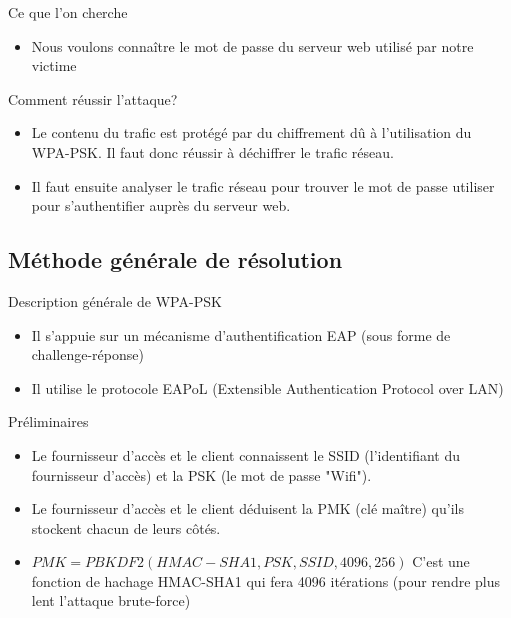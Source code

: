 \documentclass{beamer}
\begin{document}
	\begin{frame}
	\begin{block}{Ce que l'on cherche}
		\begin{itemize}
			\item Nous voulons connaître le mot de passe du serveur web utilisé par notre victime
		\end{itemize}
	\end{block}
	\begin{block}{Comment réussir l'attaque?}
		\begin{itemize}
			\item Le contenu du trafic est protégé par du chiffrement dû à l'utilisation du WPA-PSK. Il faut donc réussir à déchiffrer le trafic réseau.
			\item Il faut ensuite analyser le trafic réseau pour trouver le mot de passe utiliser pour s'authentifier auprès du serveur web.
		\end{itemize}
	\end{block}
	\end{frame}

	\subsection{Méthode générale de résolution}

	\begin{frame}
	\begin{block}{Description générale de WPA-PSK}
		\begin{itemize}
			\item Il s'appuie sur un mécanisme d'authentification EAP (sous forme de challenge-réponse)
			\item Il utilise le protocole EAPoL (Extensible Authentication Protocol over LAN)
		\end{itemize}
	\end{block}

	\begin{block}{Préliminaires}
		\begin{itemize}
			\item Le fournisseur d'accès et le client connaissent le SSID (l'identifiant du fournisseur d'accès) et la PSK (le mot de passe "Wifi").
			\item Le fournisseur d'accès et le client déduisent la PMK (clé maître) qu'ils stockent chacun de leurs côtés.
			\item $PMK = PBKDF2(HMAC-SHA1, PSK, SSID, 4096, 256)$
			C'est une fonction de hachage HMAC-SHA1 qui fera 4096 itérations (pour rendre plus lent l'attaque brute-force)
		\end{itemize}
	\end{block}
	\end{frame}
\end{document}
